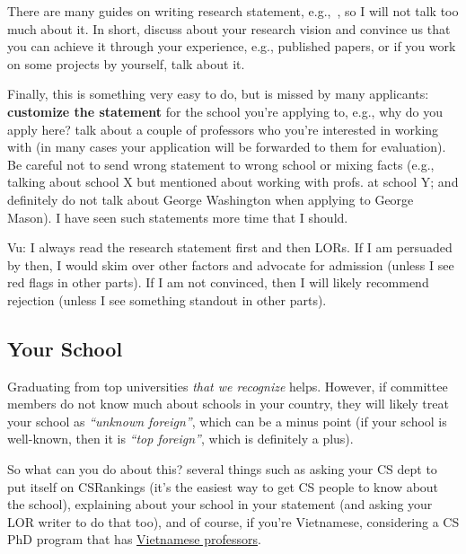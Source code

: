 \documentclass[10pt]{article}
\begin{document}
There are many guides on writing research statement, e.g.,~\cite{blattman2022writing},
so I will not talk too much about it. In short, discuss about your research vision and convince us that you can achieve it through your experience, e.g., published papers, or if you work on some projects by yourself, talk about it.

Finally, this is something very easy to do, but is missed by many
applicants: \textbf{customize the statement} for the school you're applying to,
e.g., why do you apply here? talk about a couple of professors who you're interested in working with (in many cases your application will be forwarded to them for evaluation).
Be careful not to send wrong statement to wrong school or mixing
facts (e.g., talking about school X but mentioned about working with
profs. at school Y; and definitely do not talk about George Washington when applying to George Mason). I have seen such statements more time that I
should.


\begin{tcolorbox}[left=1pt,right=1pt,top=1pt,bottom=1pt]
Vu: I always read the research statement first and then LORs. If I am
persuaded by then, I would skim over other factors and advocate for
admission (unless I see red flags in other parts). If I am not
convinced, then I will likely recommend rejection (unless I see
something standout in other parts).
\end{tcolorbox}


\subsection{Your School}\label{sec:your-school}

Graduating from top universities \emph{that we recognize} helps.
However, if committee members do not know much about schools in your country, they will likely treat your school as
\emph{``unknown foreign''}, which can be a minus point (if your school is well-known, then it is \emph{``top foreign''}, which is definitely a plus).

So what can you do about this? several things such as asking your CS dept to put itself on CSRankings (it's the easiest way to get CS people to know about the school), explaining about your school in your statement (and asking your LOR writer to do that too), and of course, if you're Vietnamese, considering a CS PhD program that has \href{https://github.com/dynaroars/dynaroars.github.io/wiki/Viet-CS-Profs-US}{Vietnamese professors}.
\end{document}
